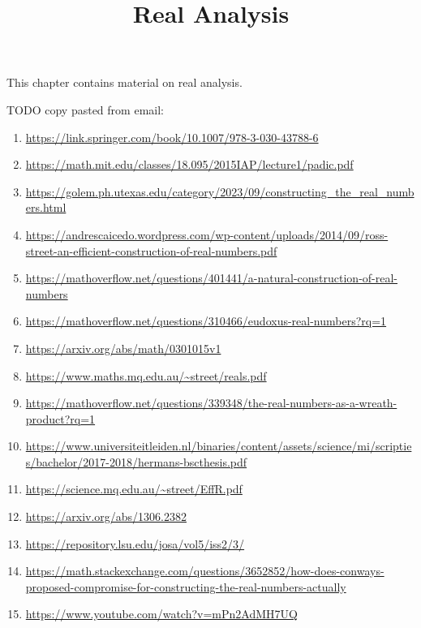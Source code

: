 

%



\title{Real Analysis}

\maketitle

\label{section-phantom}

This chapter contains material on real analysis.

\ChapterTableOfContents

TODO copy pasted from email:
\begin{enumerate}
    \item \url{https://link.springer.com/book/10.1007/978-3-030-43788-6}
    \item \url{https://math.mit.edu/classes/18.095/2015IAP/lecture1/padic.pdf}
    \item \url{https://golem.ph.utexas.edu/category/2023/09/constructing_the_real_numbers.html}
    \item \url{https://andrescaicedo.wordpress.com/wp-content/uploads/2014/09/ross-street-an-efficient-construction-of-real-numbers.pdf}
    \item \url{https://mathoverflow.net/questions/401441/a-natural-construction-of-real-numbers}
    \item \url{https://mathoverflow.net/questions/310466/eudoxus-real-numbers?rq=1}
    \item \url{https://arxiv.org/abs/math/0301015v1}
    \item \url{https://www.maths.mq.edu.au/~street/reals.pdf}
    \item \url{https://mathoverflow.net/questions/339348/the-real-numbers-as-a-wreath-product?rq=1}
    \item \url{https://www.universiteitleiden.nl/binaries/content/assets/science/mi/scripties/bachelor/2017-2018/hermans-bscthesis.pdf}
    \item \url{https://science.mq.edu.au/~street/EffR.pdf}
    \item \url{https://arxiv.org/abs/1306.2382}
    \item \url{https://repository.lsu.edu/josa/vol5/iss2/3/}
    \item \url{https://math.stackexchange.com/questions/3652852/how-does-conways-proposed-compromise-for-constructing-the-real-numbers-actually}
    \item \url{https://www.youtube.com/watch?v=mPn2AdMH7UQ}

\end{enumerate}
